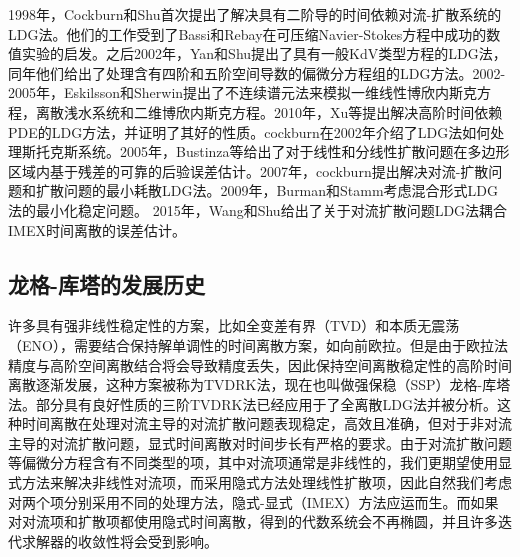 1998年，Cockburn和Shu首次提出了解决具有二阶导的时间依赖对流-扩散系统的LDG法\cite{cockburn1998local}。他们的工作受到了Bassi和Rebay在可压缩Navier-Stokes方程中成功的数值实验的启发\cite{bassi1997high}。之后2002年，Yan和Shu提出了具有一般KdV类型方程的LDG法\cite{yan2002localb}，同年他们给出了处理含有四阶和五阶空间导数的偏微分方程组的LDG方法\cite{yan2002local}。2002-2005年，Eskilsson和Sherwin提出了不连续谱元法来模拟一维线性博欣内斯克方程，离散浅水系统和二维博欣内斯克方程\cite{eskilsson2002discontinuous,eskilsson2005discontinuous,eskilsson2005discontinuousb}。2010年，Xu等提出解决高阶时间依赖PDE的LDG方法\cite{xu2010local}，并证明了其好的性质。cockburn在2002年介绍了LDG法如何处理斯托克斯系统\cite{cockburn2002local}。2005年，Bustinza等给出了对于线性和分线性扩散问题在多边形区域内基于残差的可靠的后验误差估计\cite{bustinza2005posteriori}。2007年，cockburn提出解决对流-扩散问题和扩散问题的最小耗散LDG法\cite{cockburn2007analysis}。2009年，Burman和Stamm考虑混合形式LDG法的最小化稳定问题。
2015年，Wang和Shu给出了关于对流扩散问题LDG法耦合IMEX时间离散的误差估计\cite{wang2015stability}。

\subsection{龙格-库塔的发展历史}
许多具有强非线性稳定性的方案，比如全变差有界（TVD）和本质无震荡（ENO），需要结合保持解单调性的时间离散方案，如向前欧拉。但是由于欧拉法精度与高阶空间离散结合将会导致精度丢失，因此保持空间离散稳定性的高阶时间离散逐渐发展\cite{shu1988efficient}，这种方案被称为TVDRK法，现在也叫做强保稳（SSP）龙格-库塔法。部分具有良好性质的三阶TVDRK法\cite{shu2007efficient}已经应用于了全离散LDG法并被分析\cite{wang2013errora}。这种时间离散在处理对流主导的对流扩散问题表现稳定，高效且准确，但对于非对流主导的对流扩散问题，显式时间离散对时间步长有严格的要求\cite{shu2007efficient}。由于对流扩散问题等偏微分方程含有不同类型的项，其中对流项通常是非线性的，我们更期望使用显式方法来解决非线性对流项，而采用隐式方法处理线性扩散项，因此自然我们考虑对两个项分别采用不同的处理方法，隐式-显式（IMEX）方法应运而生\cite{ascher1997implicitexplicita}。而如果对对流项和扩散项都使用隐式时间离散，得到的代数系统会不再椭圆，并且许多迭代求解器的收敛性将会受到影响。

